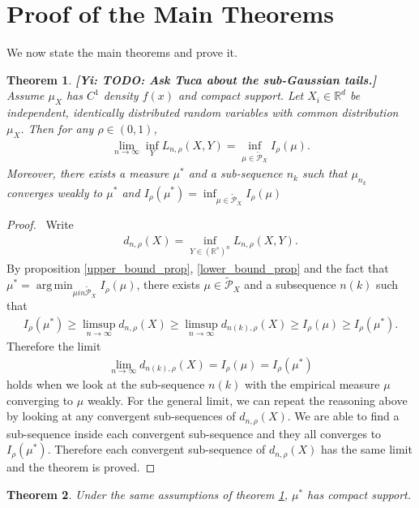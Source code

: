 \documentclass[10pt]{article}
\DeclareMathOperator*{\argmin}{arg\,min}
\newcommand{\gy}[1]{\textbf{\color{red}[Yi: #1]}}
\newtheorem{theorem}{\bf Theorem}
\newenvironment{Proof of lemma}{\noindent{\bf Proof of Lemma}}{\hfill$\Box$\newline}
\newenvironment{Proof of claim}{\noindent{\bf Proof of claim}}{\hfill$\Box$\newline}
\newenvironment{Proof of theorem}{\noindent{\bf Proof of Theorem}}{\hfill\scriptsize{$\Box$}\newline}
\newenvironment{Proof of theorems}{\noindent{\bf Proof of Theorems}}{\hfill$\Box$\newline}
\newenvironment{Proof of proposition}{\noindent{\bf Proof of Proposition}}{\hfill$\Box$\newline}
\newenvironment{Proof of propositions}{\noindent{\bf Proof of Propositions}}{\hfill$\Box$\newline}
\newenvironment{Proof of exercise}{\noindent{\it Proof of Exercise:}}{\hfill$\Box$}
\numberwithin{equation}{section}
\begin{document}
\section{Proof of the Main Theorems}
We now state the main theorems and prove it.
\begin{theorem} \label{main_theorem_1}
    \gy{TODO: Ask Tuca about the sub-Gaussian tails.}
    Assume $\mu_X$ has $C^1$ density $f(x)$ and compact support. Let $X_i \in \mathbb{R}^d$ be independent, identically distributed random variables with common distribution $\mu_X$. Then for any $\rho \in (0,1)$,
    \begin{align}
        \lim_{n \to \infty} \inf_Y L_{n,\rho}(X,Y) = \inf_{\mu \in \tilde{\mathcal{P}}_X} I_{\rho}(\mu).
    \end{align}
    Moreover, there exists a measure $\mu^*$ and a sub-sequence $n_k$ such that $\mu_{n_k}$ converges weakly to $\mu^*$ and $I_{\rho}(\mu^*) =\inf_{\mu \in \tilde{\mathcal{P}}_X} I_{\rho}(\mu)$
\end{theorem}
\begin{proof}\
    Write
    \begin{align}
        d_{n,\rho}(X) = \inf_{Y \in (\mathbb{R}^s)^n}L_{n,\rho}(X,Y).
    \end{align}
    By proposition \ref{upper_bound_prop}, \ref{lower_bound_prop} and the fact that $\mu^* = \argmin_{\mu in \tilde{\mathcal{P}}_X} I_{\rho}(\mu)$, there exists $\mu \in \tilde{\mathcal{P}}_X$ and a subsequence $n(k)$ such that
    \begin{align}
        I_{\rho}(\mu^*) \geq \limsup_{n \to \infty} d_{n,\rho}(X) \geq \limsup_{n \to \infty} d_{n(k),\rho}(X) \geq I_{\rho}(\mu) \geq I_{\rho}(\mu^*).
    \end{align}
    Therefore the limit
    \begin{align}
        \lim_{n \to \infty} d_{n(k),\rho}(X) = I_{\rho}(\mu) = I_{\rho}(\mu^*)
    \end{align}
    holds when we look at the sub-sequence $n(k)$ with the empirical measure $\mu$ converging to $\mu$ weakly. For the general limit, we can repeat the reasoning above by looking at any convergent sub-sequences of $d_{n,\rho}(X)$. We are able to find a sub-sequence inside each convergent sub-sequence and they all converges to $I_{\rho}(\mu^*)$. Therefore each convergent sub-sequence of $d_{n,\rho}(X)$ has the same limit and the theorem is proved.
\end{proof}
\begin{theorem} \label{main_theorem_2}
    Under the same assumptions of theorem \ref{main_theorem_1}, $\mu^*$ has compact support.
\end{theorem}
\end{document}
